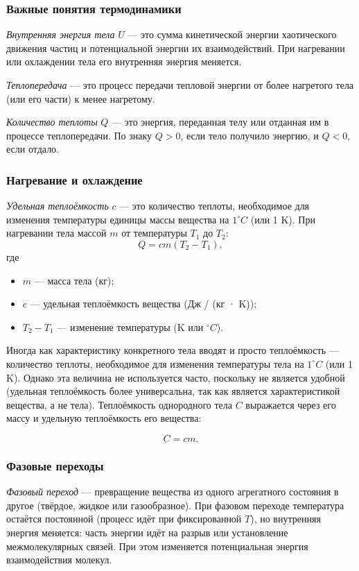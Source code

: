 \documentclass[12pt, a4paper]{article}%
\begin{document}
\subsubsection*{Важные понятия термодинамики}
\textit{Внутренняя энергия тела} $U$ — это сумма кинетической энергии хаотического движения частиц и потенциальной энергии их взаимодействий. При нагревании или охлаждении тела его внутренняя энергия меняется.

\textit{Теплопередача} — это процесс передачи тепловой энергии от более нагретого тела (или его части) к менее нагретому.

\textit{Количество теплоты} $Q$ — это энергия, переданная телу или отданная им в процессе теплопередачи. По знаку $Q>0$, если тело получило энергию, и $Q<0$, если отдало.


\subsubsection*{Нагревание и охлаждение}
\textit{Удельная теплоёмкость} $c$ — это количество теплоты, необходимое для изменения температуры единицы массы вещества на $1^\circ\!C$ (или 1 K). При нагревании тела массой $m$ от температуры $T_1$ до $T_2$:
\[
Q = cm(T_2 - T_1),
\]
где
\begin{itemize}
  \item $m$ — масса тела (кг);
  \item $c$ — удельная теплоёмкость вещества (Дж / (кг · K));
  \item $T_2 - T_1$ — изменение температуры (K или $^\circ C$).
\end{itemize}

Иногда как характеристику конкретного тела вводят и просто теплоёмкость --- количество теплоты, необходимое для изменения температуры тела на $1^\circ\!C$ (или 1 K). Однако эта величина не используется часто, поскольку не является удобной (удельная теплоёмкость более универсальна, так как является характеристикой вещества, а не тела). Теплоёмкость однородного тела $C$ выражается через его массу и удельную теплоёмкость его вещества:

\[
C = cm.
\]

\subsubsection*{Фазовые переходы}

\textit{Фазовый переход} — превращение вещества из одного агрегатного состояния в другое (твёрдое, жидкое или газообразное).
При фазовом переходе температура остаётся постоянной (процесс идёт при фиксированной $T$), но внутренняя энергия меняется:
часть энергии идёт на разрыв или установление межмолекулярных связей. При этом изменяется потенциальная энергия взаимодействия молекул.
\end{document}
